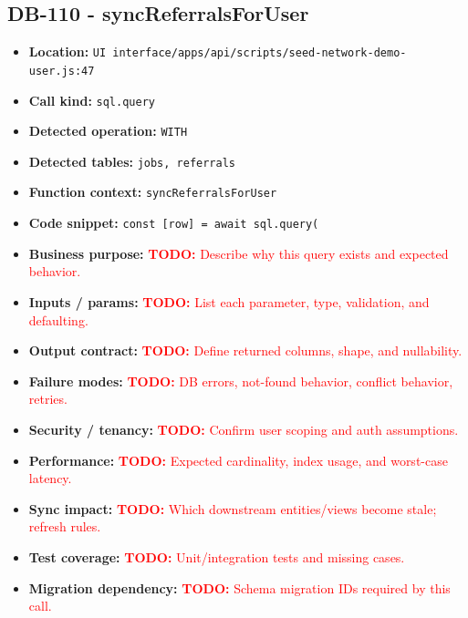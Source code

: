\documentclass[11pt]{article}
\newcommand{\todoitem}[1]{\textcolor{red}{\textbf{TODO:} #1}}
\begin{document}
\subsection{DB-110 - syncReferralsForUser}
\begin{itemize}[leftmargin=1.5em]
\item \textbf{Location:} \texttt{UI interface/apps/api/scripts/seed-network-demo-user.js:47}
\item \textbf{Call kind:} \texttt{sql.query}
\item \textbf{Detected operation:} \texttt{WITH}
\item \textbf{Detected tables:} \texttt{jobs, referrals}
\item \textbf{Function context:} \texttt{syncReferralsForUser}
\item \textbf{Code snippet:} \texttt{const [row] = await sql.query(}
\item \textbf{Business purpose:} \todoitem{Describe why this query exists and expected behavior.}
\item \textbf{Inputs / params:} \todoitem{List each parameter, type, validation, and defaulting.}
\item \textbf{Output contract:} \todoitem{Define returned columns, shape, and nullability.}
\item \textbf{Failure modes:} \todoitem{DB errors, not-found behavior, conflict behavior, retries.}
\item \textbf{Security / tenancy:} \todoitem{Confirm user scoping and auth assumptions.}
\item \textbf{Performance:} \todoitem{Expected cardinality, index usage, and worst-case latency.}
\item \textbf{Sync impact:} \todoitem{Which downstream entities/views become stale; refresh rules.}
\item \textbf{Test coverage:} \todoitem{Unit/integration tests and missing cases.}
\item \textbf{Migration dependency:} \todoitem{Schema migration IDs required by this call.}
\end{itemize}
\end{document}
